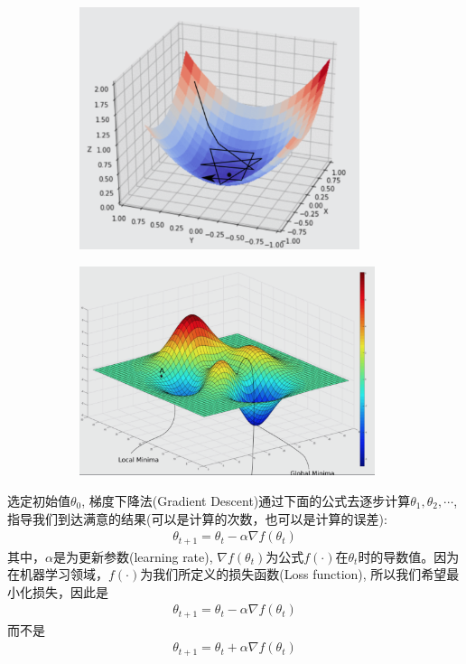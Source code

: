 \documentclass[12pt]{article}
\numberwithin{figure}{section}
\newenvironment{fullmodel}{
			\smallskip\noindent
			\begin{minipage}{\textwidth+\marginparwidth+\marginparsep}\smallskip\smallskip}
			{\smallskip\smallskip\end{minipage}\vspace{.1in}
			}
\numberwithin{equation}{section}
\begin{document}
\begin{fullmodel}
\begin{figure}[H]
\begin{subfigure}[b]{0.4\textwidth}
		\includegraphics[width=0.9\textwidth]{fig/C2C2GD3d1}
	\end{subfigure}
	\begin{subfigure}[b]{0.46\textwidth}
	\centering
		\includegraphics[width=0.95\textwidth]{fig/C2C2GD3d2}
	\end{subfigure}
\end{figure}
\end{fullmodel}

\begin{definition}
	选定初始值$\theta_0$, 梯度下降法(Gradient Descent)通过下面的公式去逐步计算$\theta_1, \theta_2, \cdots$,指导我们到达满意的结果(可以是计算的次数，也可以是计算的误差):
	\begin{align*}
		\theta_{t+1} = \theta_t - \alpha \nabla f(\theta_t)
	\end{align*}
	其中，$\alpha$是为更新参数(learning rate), $\nabla f(\theta_t)$为公式$f(\cdot)$在$\theta_t$时的导数值。因为在机器学习领域，$f(\cdot)$为我们所定义的损失函数(Loss function), 所以我们希望最小化损失，因此是
	\begin{align*}
		\theta_{t+1} = \theta_t - \alpha \nabla f(\theta_t)
	\end{align*}
	而不是
	\begin{align*}
		\theta_{t+1} = \theta_t + \alpha \nabla f(\theta_t)
	\end{align*}
\end{definition}
\end{document}
